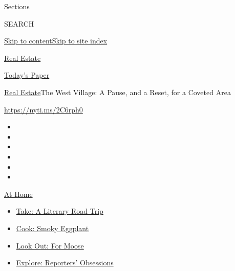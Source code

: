 Sections

SEARCH

\protect\hyperlink{site-content}{Skip to
content}\protect\hyperlink{site-index}{Skip to site index}

\href{https://www.nytimes.com/section/realestate}{Real Estate}

\href{https://myaccount.nytimes.com/auth/login?response_type=cookie\&client_id=vi}{}

\href{https://www.nytimes.com/section/todayspaper}{Today's Paper}

\href{/section/realestate}{Real Estate}\textbar{}The West Village: A
Pause, and a Reset, for a Coveted Area

\url{https://nyti.ms/2C6rph0}

\begin{itemize}
\item
\item
\item
\item
\item
\item
\end{itemize}

\href{https://www.nytimes.com/spotlight/at-home?action=click\&pgtype=Article\&state=default\&region=TOP_BANNER\&context=at_home_menu}{At
Home}

\begin{itemize}
\tightlist
\item
  \href{https://www.nytimes.com/2020/07/28/books/time-for-a-literary-road-trip.html?action=click\&pgtype=Article\&state=default\&region=TOP_BANNER\&context=at_home_menu}{Take:
  A Literary Road Trip}
\item
  \href{https://www.nytimes.com/2020/07/29/magazine/bored-with-your-home-cooking-some-smoky-eggplant-will-fix-that.html?action=click\&pgtype=Article\&state=default\&region=TOP_BANNER\&context=at_home_menu}{Cook:
  Smoky Eggplant}
\item
  \href{https://www.nytimes.com/2020/07/27/travel/moose-michigan-isle-royale.html?action=click\&pgtype=Article\&state=default\&region=TOP_BANNER\&context=at_home_menu}{Look
  Out: For Moose}
\item
  \href{https://www.nytimes.com/interactive/2020/at-home/even-more-reporters-editors-diaries-lists-recommendations.html?action=click\&pgtype=Article\&state=default\&region=TOP_BANNER\&context=at_home_menu}{Explore:
  Reporters' Obsessions}
\end{itemize}

